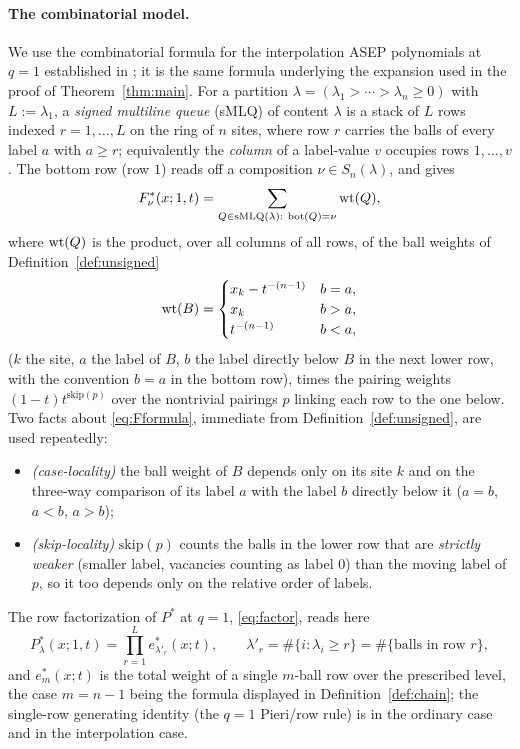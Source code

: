 \paragraph{The combinatorial model.}
We use the combinatorial formula for the interpolation ASEP polynomials at $q=1$
established in \cite[Thm.~1.15]{BDW25a}; it is the same formula underlying the
expansion used in the proof of Theorem~\ref{thm:main}. For a partition
$\lambda=(\lambda_1>\cdots>\lambda_n\ge0)$ with $L:=\lambda_1$, a
\emph{signed multiline queue} (sMLQ) of content $\lambda$ is a stack of $L$ rows
indexed $r=1,\dots,L$ on the ring of $n$ sites, where row $r$ carries the balls
of every label $a$ with $a\ge r$; equivalently the \emph{column} of a label-value
$v$ occupies rows $1,\dots,v$. The bottom row (row $1$) reads off a composition
$\nu\in S_n(\lambda)$, and \cite[Thm.~1.15]{BDW25a} gives
\begin{equation}\label{eq:Fformula}
F^*_\nu(x;1,t)=\sum_{Q\in\mathrm{sMLQ}(\lambda):\ \mathrm{bot}(Q)=\nu}\qthreewt(Q),
\end{equation}
where $\operatorname{wt}(Q)$ is the product, over all columns of all rows, of the ball
weights of Definition~\ref{def:unsigned}
\[
\operatorname{wt}(B)=\begin{cases}x_k-t^{-(n-1)} & b=a,\\ x_k & b>a,\\ t^{-(n-1)} & b<a,\end{cases}
\]
($k$ the site, $a$ the label of $B$, $b$ the label directly below $B$ in the next
lower row, with the convention $b=a$ in the bottom row), times the pairing weights
$(1-t)t^{\mathrm{skip}(p)}$ over the nontrivial pairings $p$ linking each row to
the one below. Two facts about \eqref{eq:Fformula}, immediate from
Definition~\ref{def:unsigned}, are used repeatedly:
\begin{itemize}
\item[(W1)] \emph{(case-locality)} the ball weight of $B$ depends only on its site
$k$ and on the three-way comparison of its label $a$ with the label $b$ directly
below it ($a=b$, $a<b$, $a>b$);
\item[(W2)] \emph{(skip-locality)} $\mathrm{skip}(p)$ counts the balls in the
lower row that are \emph{strictly weaker} (smaller label, vacancies counting as
label $0$) than the moving label of $p$, so it too depends only on the relative
order of labels.
\end{itemize}
The row factorization of $P^*$ at $q=1$, \eqref{eq:factor}, reads here
\begin{equation}\label{eq:Prow}
P^*_\lambda(x;1,t)=\prod_{r=1}^{L}e^*_{\lambda'_r}(x;t),\qquad
\lambda'_r=\#\{i:\lambda_i\ge r\}=\#\{\text{balls in row }r\},
\end{equation}
and $e^*_m(x;t)$ is the total weight of a single $m$-ball row over the prescribed
level, the case $m=n-1$ being the formula displayed in Definition~\ref{def:chain};
the single-row generating identity (the $q=1$ Pieri/row rule) is
\cite[Lem.~5.4]{AMW25} in the ordinary case and \cite[Lem.~5.6]{BDW25a} in the
interpolation case.


